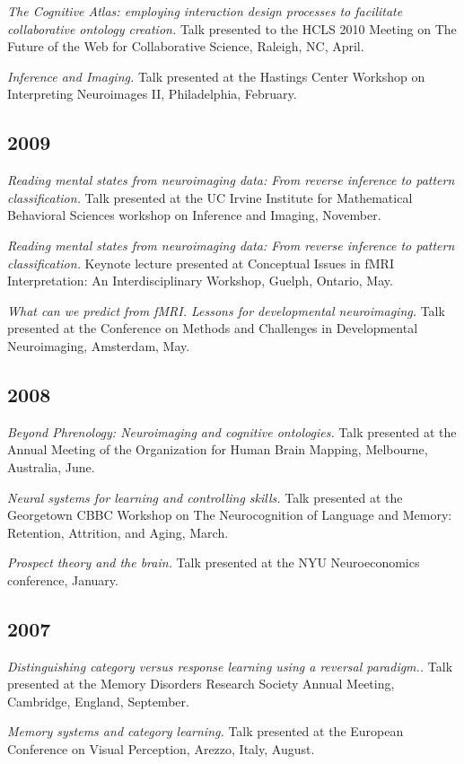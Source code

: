 \documentclass[10pt, letterpaper]{article}
\begin{document}
\textit{The Cognitive Atlas: employing interaction design processes to facilitate collaborative ontology creation.} Talk presented to the HCLS 2010 Meeting on The Future of the Web for Collaborative Science, Raleigh, NC, April.

\textit{Inference and Imaging.} Talk presented at the Hastings Center Workshop on Interpreting Neuroimages II, Philadelphia, February.

\subsection*{2009}\textit{Reading mental states from neuroimaging data: From reverse inference to pattern classification.} Talk presented at the UC Irvine Institute for Mathematical Behavioral Sciences workshop on Inference and Imaging, November.

\textit{Reading mental states from neuroimaging data: From reverse inference to pattern classification.} Keynote lecture presented at Conceptual Issues in fMRI Interpretation: An Interdisciplinary Workshop, Guelph, Ontario, May.

\textit{What can we predict from fMRI. Lessons for developmental neuroimaging.} Talk presented at the Conference on Methods and Challenges in Developmental Neuroimaging, Amsterdam, May.

\subsection*{2008}\textit{Beyond Phrenology: Neuroimaging and cognitive ontologies.} Talk presented at the Annual Meeting of the Organization for Human Brain Mapping, Melbourne, Australia, June.

\textit{Neural systems for learning and controlling skills.} Talk presented at the Georgetown CBBC Workshop on The Neurocognition of Language and Memory: Retention, Attrition, and Aging, March.

\textit{Prospect theory and the brain.} Talk presented at the NYU Neuroeconomics conference, January.

\subsection*{2007}\textit{Distinguishing category versus response learning using a reversal paradigm..} Talk presented at the Memory Disorders Research Society Annual Meeting, Cambridge, England, September.

\textit{Memory systems and category learning.} Talk presented at the European Conference on Visual Perception, Arezzo, Italy, August.
\end{document}
